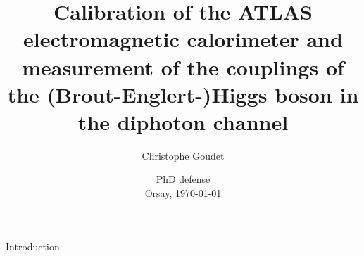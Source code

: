 \documentclass[a4paper]{beamer}
\title[Energy calibration \& Higgs couplings]{Calibration of the ATLAS electromagnetic calorimeter and measurement of the couplings of the (Brout-Englert-)Higgs boson in the diphoton channel}
\author[Goudet]{Christophe Goudet}
\institute[LAL]{\texttt{[image: LAL.jpg]} }
\date[Orsay, \today]{PhD defense \\ Orsay, \today}
\begin{document}
\transboxin
\begin{frame}
\maketitle
\end{frame}

\begin{frame}{Introduction}
\tableofcontents
\end{frame}







\begin{frame}
\maketitle
\end{frame}
\appendix

\end{document}
